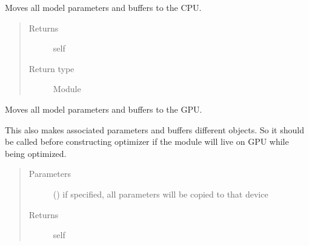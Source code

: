 \documentclass[letterpaper,10pt,english]{sphinxmanual}
\begin{document}
\begin{fulllineitems}
\begin{fulllineitems}
\begin{quote}
\begin{description}
\end{description}\end{quote}

\end{fulllineitems}


\begin{fulllineitems}
\label{\detokenize{api/dynamics:geology.metamodelling.dynamics.NeuralDifferentialEquation.cpu}}
Moves all model parameters and buffers to the CPU.
\begin{quote}\begin{description}
\item[{Returns}] \leavevmode
self

\item[{Return type}] \leavevmode
Module

\end{description}\end{quote}

\end{fulllineitems}


\begin{fulllineitems}
\label{\detokenize{api/dynamics:geology.metamodelling.dynamics.NeuralDifferentialEquation.cuda}}
Moves all model parameters and buffers to the GPU.

This also makes associated parameters and buffers different objects. So
it should be called before constructing optimizer if the module will
live on GPU while being optimized.
\begin{quote}\begin{description}
\item[{Parameters}] \leavevmode
{} (\sphinxstyleliteralemphasis{\sphinxupquote{, }}) \textendash{} if specified, all parameters will be
copied to that device

\item[{Returns}] \leavevmode
self


\end{description}
\end{quote}
\end{fulllineitems}
\end{fulllineitems}
\end{document}
